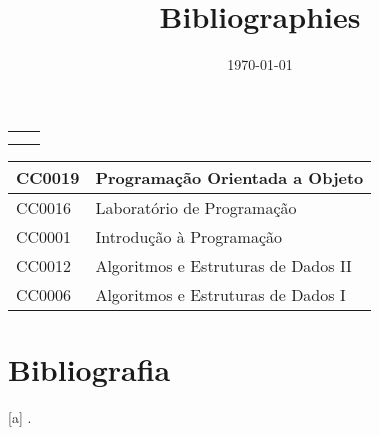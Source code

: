 \documentclass[10pt]{article}
\begin{document}
 \begin{table}
          \centering
     \begin{tabular}{c|c}
          &  \\
          & 
     \end{tabular}
     \label{tab:my_label}
 \end{table}
\begin{tabular}{|l|l|}
\hline
CC0019 & Programação Orientada a Objeto      \\ \hline
CC0016 & Laboratório de Programação          \\ \hline
CC0001 & Introdução à Programação            \\ \hline
CC0012 & Algoritmos e Estruturas de Dados II \\ \hline
CC0006 & Algoritmos e Estruturas de Dados I  \\ \hline
\end{tabular}

\section{Bibliografia}
\title{Bibliographies}
\date{\today}


\maketitle

[a] \cite{}.

\newpage




 
 


 
\end{document}
